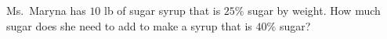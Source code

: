 Ms.\ Maryna has $10$ lb of sugar syrup that is $25\%$ sugar by weight. How much sugar does she need to add to make a syrup that is $40\%$ sugar?
